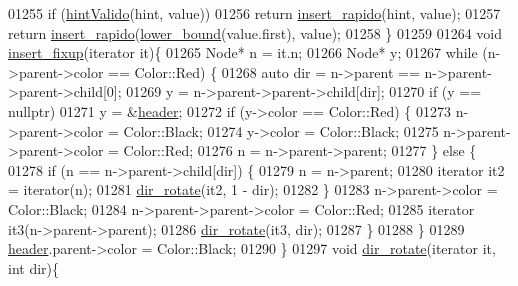 \begin{DoxyCode}
01255         \textcolor{keywordflow}{if} (\hyperlink{classaed2_1_1map_a45b04533e9acf27438813ab4a2604443_a45b04533e9acf27438813ab4a2604443}{hintValido}(hint, value))
01256             \textcolor{keywordflow}{return} \hyperlink{classaed2_1_1map_a4b4f1e65ee9aeccee4046d53fd5fd8a4_a4b4f1e65ee9aeccee4046d53fd5fd8a4}{insert_rapido}(hint, value);
01257         \textcolor{keywordflow}{return} \hyperlink{classaed2_1_1map_a4b4f1e65ee9aeccee4046d53fd5fd8a4_a4b4f1e65ee9aeccee4046d53fd5fd8a4}{insert_rapido}(\hyperlink{classaed2_1_1map_a3399d36fdd5a880b494f3a5795d3f18f_a3399d36fdd5a880b494f3a5795d3f18f}{lower_bound}(value.first), value);
01258     \}
01259 
01264     \textcolor{keywordtype}{void} \hyperlink{classaed2_1_1map_ac9197851fe5b217d45d58bbaf3612c75_ac9197851fe5b217d45d58bbaf3612c75}{insert_fixup}(iterator it)\{
01265         Node* n = it.n;
01266         Node* y;
01267         \textcolor{keywordflow}{while} (n->parent->color == Color::Red) \{
01268             \textcolor{keyword}{auto} dir = n->parent == n->parent->parent->child[0];
01269             y = n->parent->parent->child[dir];
01270             \textcolor{keywordflow}{if} (y == \textcolor{keyword}{nullptr})
01271                 y = &\hyperlink{classaed2_1_1map_a92d93f905c8ad73fba18fdc7e8915cce_a92d93f905c8ad73fba18fdc7e8915cce}{header};
01272             \textcolor{keywordflow}{if} (y->color == Color::Red) \{
01273                 n->parent->color = Color::Black;
01274                 y->color = Color::Black;
01275                 n->parent->parent->color = Color::Red;
01276                 n = n->parent->parent;
01277             \} \textcolor{keywordflow}{else} \{
01278                 \textcolor{keywordflow}{if} (n == n->parent->child[dir]) \{
01279                     n = n->parent;
01280                     iterator it2 = iterator(n);
01281                     \hyperlink{classaed2_1_1map_a94f2862ada0c9ed4f4457eac42ea8f23_a94f2862ada0c9ed4f4457eac42ea8f23}{dir_rotate}(it2, 1 - dir);
01282                 \}
01283                     n->parent->color = Color::Black;
01284                     n->parent->parent->color = Color::Red;
01285                     iterator it3(n->parent->parent);
01286                     \hyperlink{classaed2_1_1map_a94f2862ada0c9ed4f4457eac42ea8f23_a94f2862ada0c9ed4f4457eac42ea8f23}{dir_rotate}(it3, dir);
01287             \}
01288         \}
01289         \hyperlink{classaed2_1_1map_a92d93f905c8ad73fba18fdc7e8915cce_a92d93f905c8ad73fba18fdc7e8915cce}{header}.parent->color = Color::Black;
01290     \}
01297     \textcolor{keywordtype}{void} \hyperlink{classaed2_1_1map_a94f2862ada0c9ed4f4457eac42ea8f23_a94f2862ada0c9ed4f4457eac42ea8f23}{dir_rotate}(iterator it, \textcolor{keywordtype}{int} dir)\{

\end{DoxyCode}
